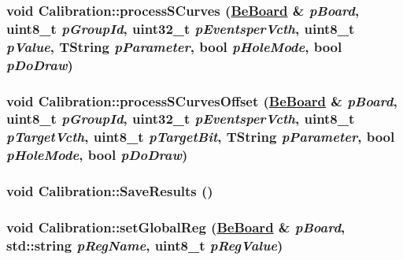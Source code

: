 \hypertarget{class_calibration_0c4e31e30ac0adf287e163960d761091}{
\subsubsection[processSCurves]{\setlength{\rightskip}{0pt plus 5cm}void Calibration::process\-SCurves (\hyperlink{class_ph2___hw_description_1_1_be_board}{Be\-Board} \& {\em p\-Board}, uint8\_\-t {\em p\-Group\-Id}, uint32\_\-t {\em p\-Eventsper\-Vcth}, uint8\_\-t {\em p\-Value}, TString {\em p\-Parameter}, bool {\em p\-Hole\-Mode}, bool {\em p\-Do\-Draw})}}
\label{class_calibration_0c4e31e30ac0adf287e163960d761091}


\hypertarget{class_calibration_29f921b720db68af7b1a889263aaac2a}{
\subsubsection[processSCurvesOffset]{\setlength{\rightskip}{0pt plus 5cm}void Calibration::process\-SCurves\-Offset (\hyperlink{class_ph2___hw_description_1_1_be_board}{Be\-Board} \& {\em p\-Board}, uint8\_\-t {\em p\-Group\-Id}, uint32\_\-t {\em p\-Eventsper\-Vcth}, uint8\_\-t {\em p\-Target\-Vcth}, uint8\_\-t {\em p\-Target\-Bit}, TString {\em p\-Parameter}, bool {\em p\-Hole\-Mode}, bool {\em p\-Do\-Draw})}}
\label{class_calibration_29f921b720db68af7b1a889263aaac2a}


\hypertarget{class_calibration_e154696d09e1b201ff1a28d99f2ed7a9}{
\subsubsection[SaveResults]{\setlength{\rightskip}{0pt plus 5cm}void Calibration::Save\-Results ()}}
\label{class_calibration_e154696d09e1b201ff1a28d99f2ed7a9}


\hypertarget{class_calibration_f70b5ced67623bace3f122e6ff96fe33}{
\subsubsection[setGlobalReg]{\setlength{\rightskip}{0pt plus 5cm}void Calibration::set\-Global\-Reg (\hyperlink{class_ph2___hw_description_1_1_be_board}{Be\-Board} \& {\em p\-Board}, std::string {\em p\-Reg\-Name}, uint8\_\-t {\em p\-Reg\-Value})}}
\label{class_calibration_f70b5ced67623bace3f122e6ff96fe33}


